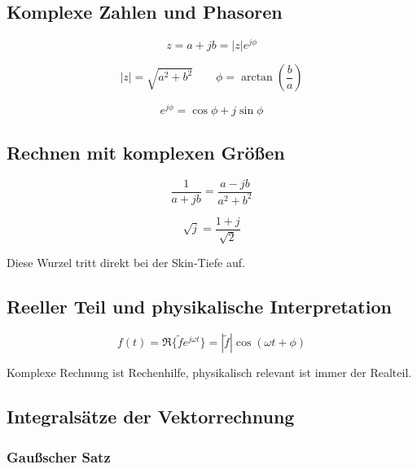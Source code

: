 \documentclass[a4paper]{article}
\begin{document}
\subsection{Komplexe Zahlen und Phasoren}

\[
z=a+jb=|z|e^{j\phi}
\]

\[
|z|=\sqrt{a^2+b^2}
\qquad
\phi=\arctan\left(\frac{b}{a}\right)
\]

\[
e^{j\phi}=\cos\phi+j\sin\phi
\]

\subsection{Rechnen mit komplexen Größen}

\[
\frac{1}{a+jb}=\frac{a-jb}{a^2+b^2}
\]

\[
\sqrt{j}=\frac{1+j}{\sqrt{2}}
\]

\begin{checkitem}
Diese Wurzel tritt direkt bei der Skin-Tiefe auf.
\end{checkitem}

\subsection{Reeller Teil und physikalische Interpretation}

\[
f(t)=\Re\{\tilde f e^{j\omega t}\}
=|\tilde f|\cos(\omega t+\phi)
\]

\begin{merke}
Komplexe Rechnung ist Rechenhilfe,
physikalisch relevant ist immer der Realteil.
\end{merke}

\subsection{Integralsätze der Vektorrechnung}

\subsubsection{Gaußscher Satz}
\end{document}

